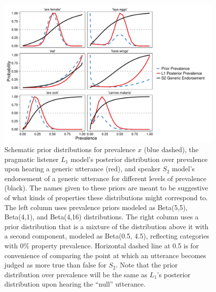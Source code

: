\documentclass[12pt,letterpaper]{article}
\begin{document}
\begin{figure}
\centering
    \includegraphics[width=\columnwidth]{schematics_s2.pdf}
    \caption{Schematic prior distributions for prevalence $x$ (blue dashed), the pragmatic listener $L_1$ model's posterior distribution over prevalence upon hearing a generic utterance (red), and speaker $S_2$ model's endorsement of a generic utterance for different levels of prevalence (black).
    The names given to these priors are meant to be suggestive of what kinds of properties these distributions might correspond to.
    The left column uses prevalence priors modeled as Beta(5,5), Beta(4,1), and Beta(4,16) distributions.
      The right column uses a prior distribution that is a mixture of the distribution above it with a second component, modeled as Beta(0.5, 4.5), reflecting categories with 0\% property prevalence.
    Horizontal dashed line at 0.5 is for convenience of comparing the point at which an utterance becomes judged as more true than false for $S_2$.
	Note that the prior distribution over prevalence will be the same as $L_1$'s posterior distribution upon hearing the ``null'' utterance.
    }
  \label{fig:schematic-unif}
\end{figure}
\end{document}

